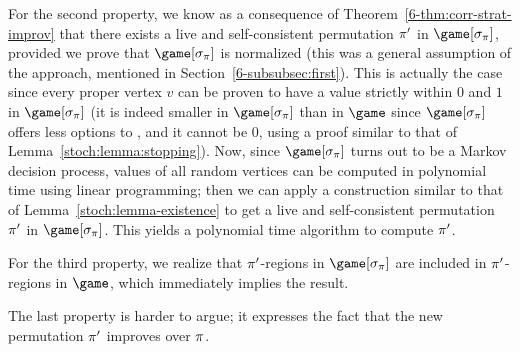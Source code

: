 For the second property, we know as a consequence of
Theorem~\ref{6-thm:corr-strat-improv} that there exists a live and
self-consistent permutation $\pi'$ in $\game[\sigma_{\perm}]$,
provided we prove that $\game[\sigma_{\perm}]$ is normalized (this was
a general assumption of the approach, mentioned in
Section~\ref{6-subsubsec:first}). This is actually the case since
every proper vertex $v$ can be proven to have a value strictly within
$0$ and $1$ in $\game[\sigma_{\perm}]$ (it is indeed smaller in
$\game[\sigma_{\perm}]$ than in $\game$ since $\game[\sigma_{\perm}]$
offers less options to \Eve, and it cannot be $0$, using a proof
similar to that of Lemma~\ref{stoch:lemma:stopping}).
Now, since $\game[\sigma_\perm]$ turns out to be a Markov decision
process, values of all random vertices can be computed in polynomial
time using linear programming; then we can apply a construction
similar to that of Lemma~\ref{stoch:lemma-existence} to get a live and
self-consistent permutation $\pi'$ in $\game[\sigma_\perm]$. This
yields a polynomial time algorithm to compute $\pi'$.

For the third property, we realize that
$\pi'$-regions in $\game[\sigma_\perm]$ are included in
$\pi'$-regions in $\game$, which immediately implies the result.


The last property is harder to argue; it expresses the fact that the
new permutation $\pi'$ improves over $\pi$.  %

